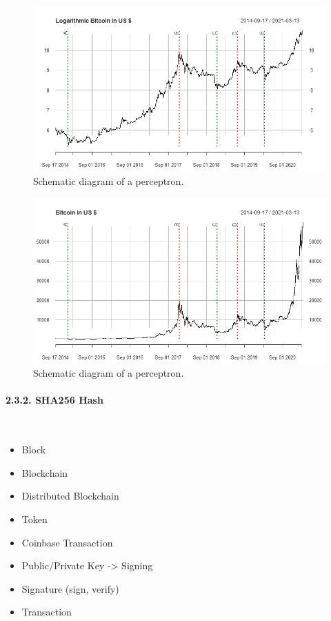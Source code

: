 \documentclass[
]{article}
\providecommand{\tightlist}{%
  \setlength{\itemsep}{0pt}\setlength{\parskip}{0pt}}
\begin{document}
\newpage

\begin{figure}

{\centering \includegraphics[width=0.8\linewidth]{images/logbtc_usd} 

}

\caption{Schematic diagram of a perceptron.}\label{fig:logprice_btc}
\end{figure}

\begin{figure}

{\centering \includegraphics[width=0.8\linewidth]{images/btc_usd} 

}

\caption{Schematic diagram of a perceptron.}\label{fig:price_btc}
\end{figure}

\newpage

\hypertarget{sha256-hash}{%
\paragraph{2.3.2. SHA256 Hash}\label{sha256-hash}}

~

\begin{itemize}
\tightlist
\item
  Block
\item
  Blockchain
\item
  Distributed Blockchain
\item
  Token
\item
  Coinbase Transaction
\item
  Public/Private Key -\textgreater{} Signing
\item
  Signature (sign, verify)
\item
  Transaction
\end{itemize}
\end{document}
